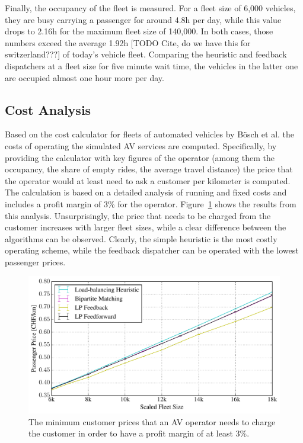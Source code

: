 Finally, the occupancy of the fleet is measured. For a fleet size of 6,000
vehicles, they are busy carrying a passenger for around 4.8h per day, while
this value drops to 2.16h for the maximum fleet size of 140,000. In both cases,
those numbers exceed the average 1.92h [TODO Cite, do we have this for switzerland???] of today's vehicle fleet.
Comparing the heuristic and feedback dispatchers at a fleet size for five minute
wait time, the vehicles in the latter one are occupied almost one hour more per day.

\subsection{Cost Analysis}
\label{sec:cost_analysis}

Based on the cost calculator for fleets of automated vehicles by Bösch et al. \cite{cost_paper}
 the costs of operating the simulated
AV services are computed. Specifically, by providing the calculator with key
figures of the operator (among them the occupancy, the share of empty rides, the
average travel distance) the price that the operator would at least need to ask
a customer per kilometer is computed. The calculation
is based on a detailed analysis of running and fixed costs and includes a
profit margin of 3\% for the operator. Figure~\ref{fig:passenger_price}
shows the results from this analysis. Unsurprisingly, the price that needs to be
charged from the customer increases with larger fleet sizes, while a clear difference
between the algorithms can be observed. Clearly, the simple heuristic is the most
costly operating scheme, while the feedback dispatcher can be operated with the
lowest passenger prices.

\begin{figure}
\includegraphics[width=1.0\textwidth]{figures/01_passenger_price.pdf}
\caption{The minimum customer prices that an AV operator needs to charge the customer
in order to have a profit margin of at least 3\%.}
\label{fig:passenger_price}
\end{figure}


